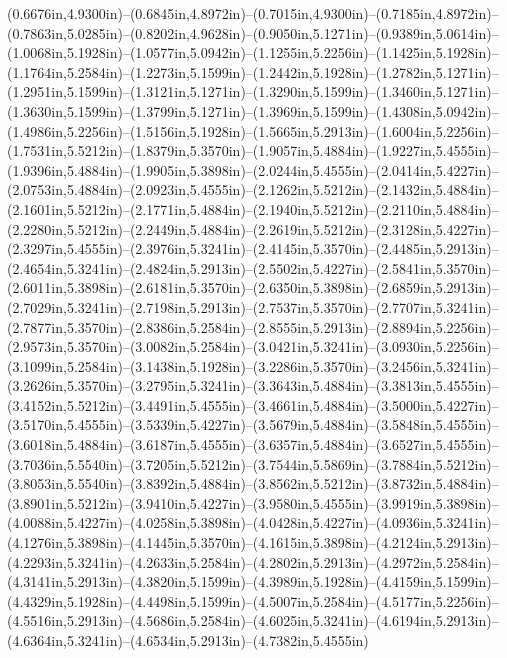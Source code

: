 (0.6676in,4.9300in)--(0.6845in,4.8972in)--(0.7015in,4.9300in)--(0.7185in,4.8972in)--(0.7863in,5.0285in)--(0.8202in,4.9628in)--(0.9050in,5.1271in)--(0.9389in,5.0614in)--(1.0068in,5.1928in)--(1.0577in,5.0942in)--(1.1255in,5.2256in)--(1.1425in,5.1928in)--(1.1764in,5.2584in)--(1.2273in,5.1599in)--(1.2442in,5.1928in)--(1.2782in,5.1271in)--(1.2951in,5.1599in)--(1.3121in,5.1271in)--(1.3290in,5.1599in)--(1.3460in,5.1271in)--(1.3630in,5.1599in)--(1.3799in,5.1271in)--(1.3969in,5.1599in)--(1.4308in,5.0942in)--(1.4986in,5.2256in)--(1.5156in,5.1928in)--(1.5665in,5.2913in)--(1.6004in,5.2256in)--(1.7531in,5.5212in)--(1.8379in,5.3570in)--(1.9057in,5.4884in)--(1.9227in,5.4555in)--(1.9396in,5.4884in)--(1.9905in,5.3898in)--(2.0244in,5.4555in)--(2.0414in,5.4227in)--(2.0753in,5.4884in)--(2.0923in,5.4555in)--(2.1262in,5.5212in)--(2.1432in,5.4884in)--(2.1601in,5.5212in)--(2.1771in,5.4884in)--(2.1940in,5.5212in)--(2.2110in,5.4884in)--(2.2280in,5.5212in)--(2.2449in,5.4884in)--(2.2619in,5.5212in)--(2.3128in,5.4227in)--(2.3297in,5.4555in)--(2.3976in,5.3241in)--(2.4145in,5.3570in)--(2.4485in,5.2913in)--(2.4654in,5.3241in)--(2.4824in,5.2913in)--(2.5502in,5.4227in)--(2.5841in,5.3570in)--(2.6011in,5.3898in)--(2.6181in,5.3570in)--(2.6350in,5.3898in)--(2.6859in,5.2913in)--(2.7029in,5.3241in)--(2.7198in,5.2913in)--(2.7537in,5.3570in)--(2.7707in,5.3241in)--(2.7877in,5.3570in)--(2.8386in,5.2584in)--(2.8555in,5.2913in)--(2.8894in,5.2256in)--(2.9573in,5.3570in)--(3.0082in,5.2584in)--(3.0421in,5.3241in)--(3.0930in,5.2256in)--(3.1099in,5.2584in)--(3.1438in,5.1928in)--(3.2286in,5.3570in)--(3.2456in,5.3241in)--(3.2626in,5.3570in)--(3.2795in,5.3241in)--(3.3643in,5.4884in)--(3.3813in,5.4555in)--(3.4152in,5.5212in)--(3.4491in,5.4555in)--(3.4661in,5.4884in)--(3.5000in,5.4227in)--(3.5170in,5.4555in)--(3.5339in,5.4227in)--(3.5679in,5.4884in)--(3.5848in,5.4555in)--(3.6018in,5.4884in)--(3.6187in,5.4555in)--(3.6357in,5.4884in)--(3.6527in,5.4555in)--(3.7036in,5.5540in)--(3.7205in,5.5212in)--(3.7544in,5.5869in)--(3.7884in,5.5212in)--(3.8053in,5.5540in)--(3.8392in,5.4884in)--(3.8562in,5.5212in)--(3.8732in,5.4884in)--(3.8901in,5.5212in)--(3.9410in,5.4227in)--(3.9580in,5.4555in)--(3.9919in,5.3898in)--(4.0088in,5.4227in)--(4.0258in,5.3898in)--(4.0428in,5.4227in)--(4.0936in,5.3241in)--(4.1276in,5.3898in)--(4.1445in,5.3570in)--(4.1615in,5.3898in)--(4.2124in,5.2913in)--(4.2293in,5.3241in)--(4.2633in,5.2584in)--(4.2802in,5.2913in)--(4.2972in,5.2584in)--(4.3141in,5.2913in)--(4.3820in,5.1599in)--(4.3989in,5.1928in)--(4.4159in,5.1599in)--(4.4329in,5.1928in)--(4.4498in,5.1599in)--(4.5007in,5.2584in)--(4.5177in,5.2256in)--(4.5516in,5.2913in)--(4.5686in,5.2584in)--(4.6025in,5.3241in)--(4.6194in,5.2913in)--(4.6364in,5.3241in)--(4.6534in,5.2913in)--(4.7382in,5.4555in) 